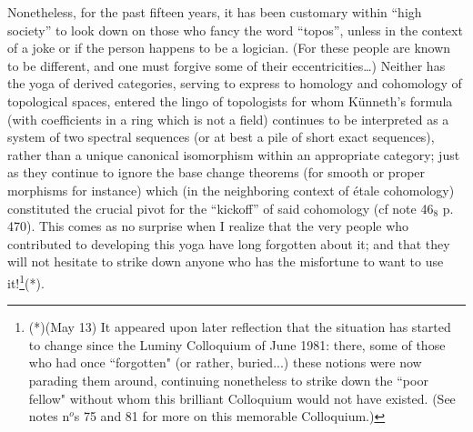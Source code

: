 Nonetheless, for the past fifteen years, it has been customary within ``high society'' to 
look down on those who fancy the word ``topos'', unless in the context of a
joke or if the person happens to be a logician.
(For these people are known to be different, and one must forgive some of their
eccentricities\ldots)
Neither has the yoga of derived categories, serving to express to homology and cohomology
of topological spaces, entered the lingo of topologists for whom K\"unneth's formula
(with coefficients in a ring which is not a field)
continues to be interpreted as a system of two spectral sequences (or at best a pile of
short exact sequences), 
rather than a unique canonical isomorphism within an appropriate category;
just as they continue to ignore the base change theorems (for smooth or proper morphisms
for instance) which (in the neighboring context of \'etale cohomology) constituted the
crucial pivot for the ``kickoff'' of said cohomology (cf note 46$_8$ p. 470).
This comes as no surprise when I realize that the very people who contributed to developing
this yoga have long forgotten about it; and that they will not hesitate to 
strike down anyone who has the misfortune to want to use it!\footnote{(*)(May 13) It appeared upon later reflection that the situation has started to change since the Luminy Colloquium of June 1981: there, some of those who had once ``forgotten" (or rather, buried...) these notions were now parading them around,  continuing nonetheless to strike down the ``poor fellow" without whom this brilliant Colloquium would not have existed. (See notes n$^o$s 75 and 81 for more on this memorable Colloquium.) }(*).

